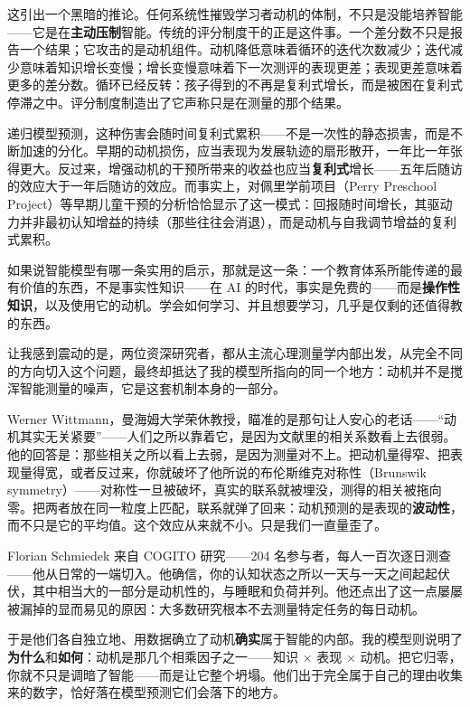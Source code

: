 \documentclass[11pt, twoside, openright]{book}
\begin{document}
这引出一个黑暗的推论。任何系统性摧毁学习者动机的体制，不只是没能培养智能------它是在\textbf{主动压制}智能。传统的评分制度干的正是这件事。一个差分数不只是报告一个结果；它攻击的是动机组件。动机降低意味着循环的迭代次数减少；迭代减少意味着知识增长变慢；增长变慢意味着下一次测评的表现更差；表现更差意味着更多的差分数。循环已经反转：孩子得到的不再是复利式增长，而是被困在复利式停滞之中。评分制度制造出了它声称只是在测量的那个结果。

递归模型预测，这种伤害会随时间复利式累积------不是一次性的静态损害，而是不断加速的分化。早期的动机损伤，应当表现为发展轨迹的扇形散开，一年比一年张得更大。反过来，增强动机的干预所带来的收益也应当\textbf{复利式}增长------五年后随访的效应大于一年后随访的效应。而事实上，对佩里学前项目（Perry Preschool Project）等早期儿童干预的分析恰恰显示了这一模式：回报随时间增长，其驱动力并非最初认知增益的持续（那些往往会消退），而是动机与自我调节增益的复利式累积。

如果说智能模型有哪一条实用的启示，那就是这一条：一个教育体系所能传递的最有价值的东西，不是事实性知识------在 AI 的时代，事实是免费的------而是\textbf{操作性知识}，以及使用它的动机。学会如何学习、并且想要学习，几乎是仅剩的还值得教的东西。

让我感到震动的是，两位资深研究者，都从主流心理测量学内部出发，从完全不同的方向切入这个问题，最终却抵达了我的模型所指向的同一个地方：动机并不是搅浑智能测量的噪声，它是这套机制本身的一部分。

Werner Wittmann，曼海姆大学荣休教授，瞄准的是那句让人安心的老话------“动机其实无关紧要”------人们之所以靠着它，是因为文献里的相关系数看上去很弱。他的回答是：那些相关之所以看上去弱，是因为测量对不上。把动机量得窄、把表现量得宽，或者反过来，你就破坏了他所说的布伦斯维克对称性（Brunswik symmetry）------对称性一旦被破坏，真实的联系就被埋没，测得的相关被拖向零。把两者放在同一粒度上匹配，联系就弹了回来：动机预测的是表现的\textbf{波动性}，而不只是它的平均值。这个效应从来就不小。只是我们一直量歪了。

Florian Schmiedek 来自 COGITO 研究------204 名参与者，每人一百次逐日测查------他从日常的一端切入。他确信，你的认知状态之所以一天与一天之间起起伏伏，其中相当大的一部分是动机性的，与睡眠和负荷并列。他还点出了这一点屡屡被漏掉的显而易见的原因：大多数研究根本不去测量特定任务的每日动机。

于是他们各自独立地、用数据确立了动机\textbf{确实}属于智能的内部。我的模型则说明了\textbf{为什么}和\textbf{如何}：动机是那几个相乘因子之一------知识 × 表现 × 动机。把它归零，你就不只是调暗了智能------而是让它整个坍塌。他们出于完全属于自己的理由收集来的数字，恰好落在模型预测它们会落下的地方。
\end{document}
